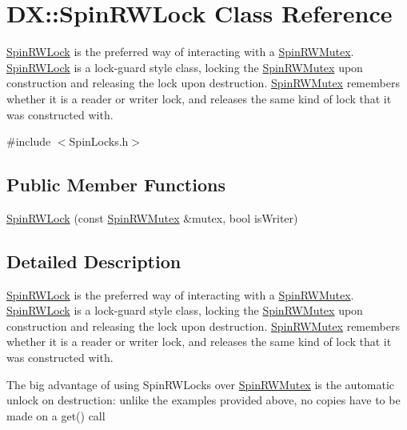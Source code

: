 \hypertarget{class_d_x_1_1_spin_r_w_lock}{\section{D\-X\-:\-:Spin\-R\-W\-Lock Class Reference}
\label{class_d_x_1_1_spin_r_w_lock}
}


\hyperlink{class_d_x_1_1_spin_r_w_lock}{Spin\-R\-W\-Lock} is the preferred way of interacting with a \hyperlink{class_d_x_1_1_spin_r_w_mutex}{Spin\-R\-W\-Mutex}. \hyperlink{class_d_x_1_1_spin_r_w_lock}{Spin\-R\-W\-Lock} is a lock-\/guard style class, locking the \hyperlink{class_d_x_1_1_spin_r_w_mutex}{Spin\-R\-W\-Mutex} upon construction and releasing the lock upon destruction. \hyperlink{class_d_x_1_1_spin_r_w_mutex}{Spin\-R\-W\-Mutex} remembers whether it is a reader or writer lock, and releases the same kind of lock that it was constructed with.  




{\ttfamily \#include $<$Spin\-Locks.\-h$>$}

\subsection*{Public Member Functions}
\begin{DoxyCompactItemize}
\item 
\hyperlink{class_d_x_1_1_spin_r_w_lock_a031480610e0da0bd664ada662057b99c}{Spin\-R\-W\-Lock} (const \hyperlink{class_d_x_1_1_spin_r_w_mutex}{Spin\-R\-W\-Mutex} \&mutex, bool is\-Writer)
\end{DoxyCompactItemize}


\subsection{Detailed Description}
\hyperlink{class_d_x_1_1_spin_r_w_lock}{Spin\-R\-W\-Lock} is the preferred way of interacting with a \hyperlink{class_d_x_1_1_spin_r_w_mutex}{Spin\-R\-W\-Mutex}. \hyperlink{class_d_x_1_1_spin_r_w_lock}{Spin\-R\-W\-Lock} is a lock-\/guard style class, locking the \hyperlink{class_d_x_1_1_spin_r_w_mutex}{Spin\-R\-W\-Mutex} upon construction and releasing the lock upon destruction. \hyperlink{class_d_x_1_1_spin_r_w_mutex}{Spin\-R\-W\-Mutex} remembers whether it is a reader or writer lock, and releases the same kind of lock that it was constructed with. 

The big advantage of using Spin\-R\-W\-Locks over \hyperlink{class_d_x_1_1_spin_r_w_mutex}{Spin\-R\-W\-Mutex} is the automatic unlock on destruction\-: unlike the examples provided above, no copies have to be made on a get() call

